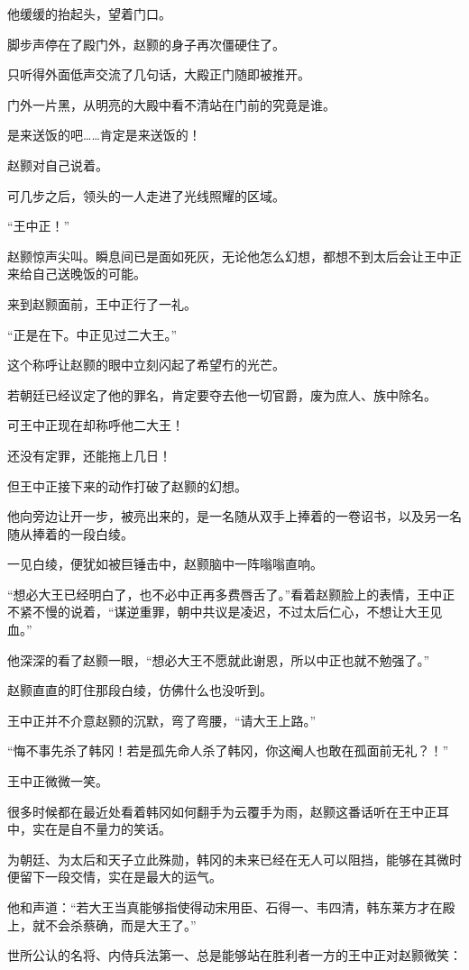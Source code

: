 他缓缓的抬起头，望着门口。

脚步声停在了殿门外，赵颢的身子再次僵硬住了。

只听得外面低声交流了几句话，大殿正门随即被推开。

门外一片黑，从明亮的大殿中看不清站在门前的究竟是谁。

是来送饭的吧……肯定是来送饭的！

赵颢对自己说着。

可几步之后，领头的一人走进了光线照耀的区域。

“王中正！”

赵颢惊声尖叫。瞬息间已是面如死灰，无论他怎么幻想，都想不到太后会让王中正来给自己送晚饭的可能。

来到赵颢面前，王中正行了一礼。

“正是在下。中正见过二大王。”

这个称呼让赵颢的眼中立刻闪起了希望冇的光芒。

若朝廷已经议定了他的罪名，肯定要夺去他一切官爵，废为庶人、族中除名。

可王中正现在却称呼他二大王！

还没有定罪，还能拖上几日！

但王中正接下来的动作打破了赵颢的幻想。

他向旁边让开一步，被亮出来的，是一名随从双手上捧着的一卷诏书，以及另一名随从捧着的一段白绫。

一见白绫，便犹如被巨锤击中，赵颢脑中一阵嗡嗡直响。

“想必大王已经明白了，也不必中正再多费唇舌了。”看着赵颢脸上的表情，王中正不紧不慢的说着，“谋逆重罪，朝中共议是凌迟，不过太后仁心，不想让大王见血。”

他深深的看了赵颢一眼，“想必大王不愿就此谢恩，所以中正也就不勉强了。”

赵颢直直的盯住那段白绫，仿佛什么也没听到。

王中正并不介意赵颢的沉默，弯了弯腰，“请大王上路。”

“悔不事先杀了韩冈！若是孤先命人杀了韩冈，你这阉人也敢在孤面前无礼？！”

王中正微微一笑。

很多时候都在最近处看着韩冈如何翻手为云覆手为雨，赵颢这番话听在王中正耳中，实在是自不量力的笑话。

为朝廷、为太后和天子立此殊勋，韩冈的未来已经在无人可以阻挡，能够在其微时便留下一段交情，实在是最大的运气。

他和声道：“若大王当真能够指使得动宋用臣、石得一、韦四清，韩东莱方才在殿上，就不会杀蔡确，而是大王了。”

世所公认的名将、内侍兵法第一、总是能够站在胜利者一方的王中正对赵颢微笑：

